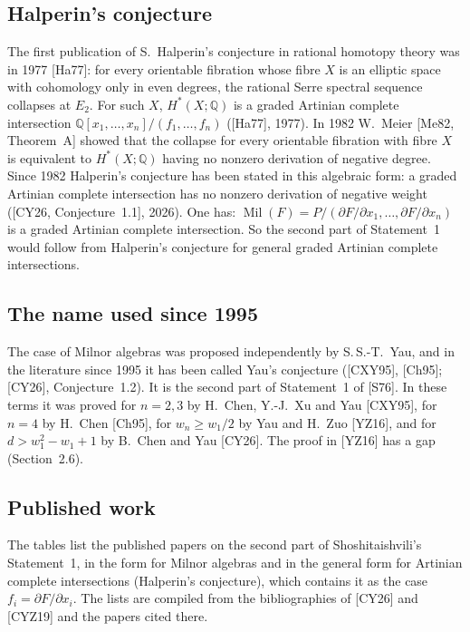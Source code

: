 \documentclass[11pt]{article}
\newcommand{\Mil}{\operatorname{Mil}(F)}
\theoremstyle{remark}
\begin{document}
\subsection{Halperin's conjecture}

The first publication of S.~Halperin's conjecture in rational homotopy theory was in 1977 [Ha77]: for every orientable fibration whose fibre $X$ is an elliptic space with cohomology only in even degrees, the rational Serre spectral sequence collapses at $E_2$. For such $X$, $H^*(X;\mathbb Q)$ is a graded Artinian complete intersection $\mathbb Q[x_1,\dots,x_n]/(f_1,\dots,f_n)$ ([Ha77], 1977). In 1982 W.~Meier [Me82, Theorem~A] showed that the collapse for every orientable fibration with fibre $X$ is equivalent to $H^*(X;\mathbb Q)$ having no nonzero derivation of negative degree. Since 1982 Halperin's conjecture has been stated in this algebraic form: a graded Artinian complete intersection has no nonzero derivation of negative weight ([CY26, Conjecture~1.1], 2026). One has: $\Mil=P/(\partial F/\partial x_1,\dots,\partial F/\partial x_n)$ is a graded Artinian complete intersection. So the second part of Statement~1 would follow from Halperin's conjecture for general graded Artinian complete intersections.

\subsection{The name used since 1995}

The case of Milnor algebras was proposed independently by S.\,S.-T.~Yau, and in the literature since 1995 it has been called Yau's conjecture ([CXY95], [Ch95]; [CY26], Conjecture~1.2). It is the second part of Statement~1 of [S76]. In these terms it was proved for $n=2,3$ by H.~Chen, Y.-J.~Xu and Yau [CXY95], for $n=4$ by H.~Chen [Ch95], for $w_n\ge w_1/2$ by Yau and H.~Zuo [YZ16], and for $d>w_1^2-w_1+1$ by B.~Chen and Yau [CY26]. The proof in [YZ16] has a gap (Section~2.6).

\subsection{Published work}

The tables list the published papers on the second part of Shoshitaishvili's Statement~1, in the form for Milnor algebras and in the general form for Artinian complete intersections (Halperin's conjecture), which contains it as the case $f_i=\partial F/\partial x_i$. The lists are compiled from the bibliographies of [CY26] and [CYZ19] and the papers cited there.
\end{document}
